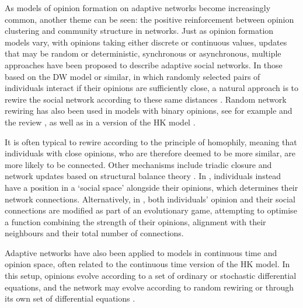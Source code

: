 \documentclass{article}
\begin{document}
As models of opinion formation on adaptive networks become increasingly common, another theme can be seen: the positive reinforcement between opinion clustering and community structure in networks. Just as opinion formation models vary, with opinions taking either discrete or continuous values, updates that may be random or deterministic, synchronous or asynchronous, multiple approaches have been proposed to describe adaptive social networks. In those based on the DW model or similar, in which randomly selected pairs of individuals interact if their opinions are sufficiently close, a natural approach is to rewire the social network according to these same distances \cite{kan2023adaptive,yu2017opinion,gargiulo2009opinion,de2022modelling}. Random network rewiring has also been used in models with binary opinions, see for example \cite{borges2024social,min2023coevolutionary} and the review \cite{vazquez2013opinion}, as well as in a version of the HK model \cite{su2014coevolution}. 

It is often typical to rewire according to the principle of homophily, meaning that individuals with close opinions, who are therefore deemed to be more similar, are more likely to be connected. Other mechanisms include triadic closure \cite{asikainen2020cumulative} and network updates based on structural balance theory \cite{kang2022coevolution}. In \cite{djurdjevac2024co}, individuals instead have a position in a `social space' alongside their opinions, which determines their network connections. Alternatively, in \cite{evans2018opinion}, both individuals' opinion and their social connections are modified as part of an evolutionary game, attempting to optimise a function combining the strength of their opinions, alignment with their neighbours and their total number of connections. 

Adaptive networks have also been applied to models in continuous time and opinion space, often related to the continuous time version of the HK model. In this setup, opinions evolve according to a set of ordinary or stochastic differential equations, and the network may evolve according to random rewiring \cite{iniguez2009opinion,liu2023emergence} or through its own set of differential equations \cite{nugent2023evolving,NugentGomesWolfram2024}. 
\end{document}
